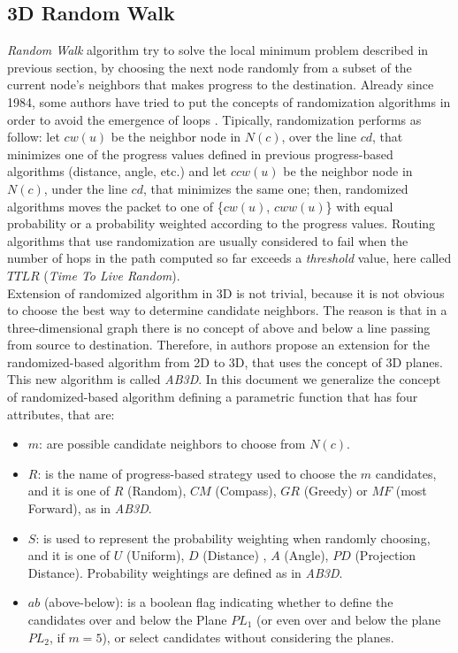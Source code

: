 \documentclass[journal,comsoc]{IEEEtran}
\begin{document}
\subsection{3D Random Walk}
\emph{Random Walk} algorithm try to solve the local minimum problem described in previous section, by choosing the next node randomly from a subset of the current node's neighbors that makes progress to the destination. Already since 1984, some authors have tried to put the concepts of randomization algorithms in order to avoid the emergence of loops \cite{nelson:random, bose:compass, fevens:abface}. Tipically, randomization performs as follow: let \(cw(u)\) be the neighbor node in \(N(c)\), over the line \(cd\), that minimizes one of the progress values defined in previous progress-based algorithms (distance, angle, etc.) and let \(ccw(u)\) be the neighbor node in \(N(c)\), under the line \(cd\), that minimizes the same one; then, randomized algorithms moves the packet to one of \{\(cw(u)\), \(cww(u)\)\} with equal probability or a probability weighted according to the progress values. Routing algorithms that use randomization are usually considered to fail when the number of hops in the path computed so far exceeds a \emph{threshold} value, here called \(TTLR\) (\emph{Time To Live Random}).\\
Extension of randomized algorithm in 3D is not trivial, because it is not obvious to choose the best way to determine candidate neighbors. The reason is that in a three-dimensional graph there is no concept of above and below a line passing from source to destination. Therefore, in \cite{abdallah:random} authors propose an extension for the randomized-based algorithm from 2D to 3D, that uses the concept of 3D planes. This new algorithm is called \emph{AB3D}. In this document we generalize the concept of randomized-based algorithm defining a parametric function that has four attributes, that are:
\begin{itemize}
\item \(m\): are possible candidate neighbors to choose from \(N(c)\).
\item \(R\): is the name of progress-based strategy used to choose the \(m\) candidates, and it is one of \(R\) (Random), \(CM\) (Compass), \(GR\) (Greedy) or \(MF\) (most Forward), as in \emph{AB3D}.
\item \(S\): is used to represent the probability weighting when randomly choosing, and it is one of \(U\) (Uniform), \(D\) (Distance) , \(A\) (Angle), \(PD\) (Projection Distance). Probability weightings are defined as in \emph{AB3D}.
\item \(ab\) (above-below): is a boolean flag indicating whether to define the candidates over and below the Plane \(PL_1\) (or even over and below the plane \(PL_2\), if \(m = 5\)), or select candidates without considering the planes.
\end{itemize}
\end{document}
